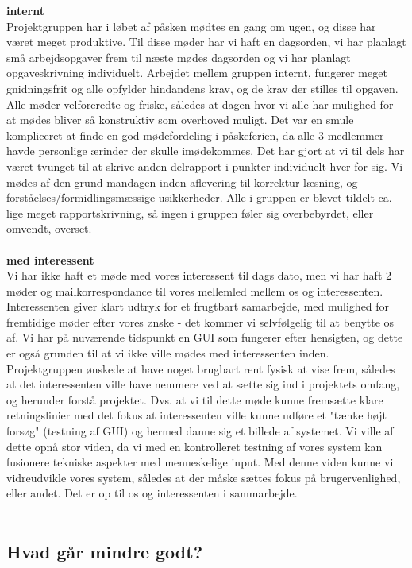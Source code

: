 \documentclass[a4paper,12pt]{article}
\begin{document}
\textbf{internt}\\
Projektgruppen har i løbet af påsken mødtes en gang om ugen, og disse har været meget produktive. Til disse møder har vi haft en dagsorden, vi har planlagt små arbejdsopgaver frem til næste mødes dagsorden og vi har planlagt opgaveskrivning individuelt. Arbejdet mellem gruppen internt, fungerer meget gnidningsfrit og alle opfylder hindandens krav, og de krav der stilles til opgaven. Alle møder velforeredte og friske, således at dagen hvor vi alle har mulighed for at mødes bliver så konstruktiv som overhoved muligt.
Det var en smule kompliceret at finde en god mødefordeling i påskeferien, da alle 3 medlemmer havde personlige ærinder der skulle imødekommes. Det har gjort at vi til dels har været tvunget til at skrive anden delrapport i punkter individuelt hver for sig. Vi mødes af den grund mandagen inden aflevering til korrektur læsning, og forståelses/formidlingsmæssige usikkerheder. Alle i gruppen er blevet tildelt ca. lige meget rapportskrivning, så ingen i gruppen føler sig overbebyrdet, eller omvendt, overset. 
\\
\\
\textbf{med interessent}
\\
Vi har ikke haft et møde med vores interessent til dags dato, men vi har haft 2 møder og mailkorrespondance til vores mellemled mellem os og interessenten. Interessenten giver klart udtryk for et frugtbart samarbejde, med mulighed for fremtidige møder efter vores ønske - det kommer vi selvfølgelig til at benytte os af.
Vi har på nuværende tidspunkt en GUI som fungerer efter hensigten, og dette er også grunden til at vi ikke ville mødes med interessenten inden. Projektgruppen ønskede at have noget brugbart rent fysisk at vise frem, således at det interessenten ville have nemmere ved at sætte sig ind i projektets omfang, og herunder forstå projektet. Dvs. at vi til dette møde kunne fremsætte klare retningslinier med det fokus at interessenten ville kunne udføre et "tænke højt forsøg" (testning af GUI) og hermed danne sig et billede af systemet. Vi ville af dette opnå stor viden, da vi med en kontrolleret testning af vores system kan fusionere tekniske aspekter med menneskelige input.
Med denne viden kunne vi vidreudvikle vores system, således at der måske sættes fokus på brugervenlighed, eller andet. Det er op til os og interessenten i sammarbejde.
\\
\\
\subsection{Hvad går mindre godt?}
\end{document}

